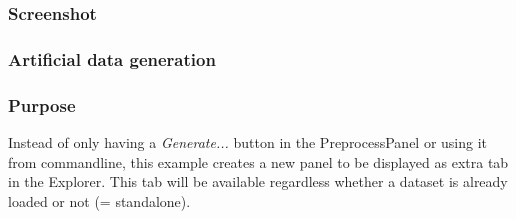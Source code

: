 \newpage
\subsubsection*{Screenshot}
\begin{center}
\end{center}

\newpage
\subsubsection*{Artificial data generation}
\subsubsection*{Purpose}
Instead of only having a \textit{Generate...} button in the PreprocessPanel or
using it from commandline, this example creates a new panel to be displayed as
extra tab in the Explorer. This tab will be available regardless whether a
dataset is already loaded or not (= standalone).

